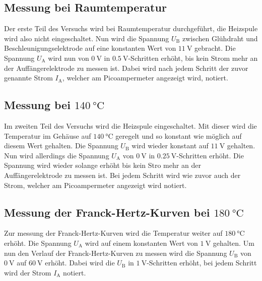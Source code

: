\subsection{Messung bei Raumtemperatur}
Der erste Teil des Versuchs wird bei Raumtemperatur durchgeführt, die Heizspule wird also nicht eingeschaltet.
Nun wird die Spannung $U_\text{B}$ zwischen Glühdraht und Beschleunigungselektrode auf eine konstanten Wert von $\SI{11}{\V}$ gebracht.
Die Spannung $U_\text{A}$ wird nun von $\SI{0}{\V}$ in $\SI{0.5}{\V}$-Schritten erhöht, bis kein Strom mehr an der Auffängerelektrode zu messen ist.
Dabei wird nach jedem Schritt der zuvor genannte Strom $I_\text{A}$, welcher am Picoampermeter angezeigt wird, notiert.

\subsection{Messung bei $\SI{140}{\celsius}$}
Im zweiten Teil des Versuchs wird die Heizspule eingeschaltet.
Mit dieser wird die Temperatur im Gehäuse auf $\SI{140}{\celsius}$ geregelt und so konstant wie möglich auf diesem Wert gehalten.
Die Spannung $U_\text{B}$ wird wieder konstant auf $\SI{11}{\V}$ gehalten.
Nun wird allerdings die Spannung $U_\text{A}$ von $\SI{0}{\V}$ in $\SI{0.25}{\V}$-Schritten erhöht.
Die Spannung wird wieder solange erhöht bis kein Stro mehr an der Auffängerelektrode zu messen ist.
Bei jedem Schritt wird wie zuvor auch der Strom, welcher am Picoampermeter angezeigt wird notiert.

\subsection{Messung der Franck-Hertz-Kurven bei $\SI{180}{\celsius}$}
Zur messung der Franck-Hertz-Kurven wird die Temperatur weiter auf $\SI{180}{\celsius}$ erhöht.
Die Spannung $U_\text{A}$ wird auf einem konstanten Wert von $\SI{1}{\V}$ gehalten.
Um nun den Verlauf der Franck-Hertz-Kurven zu messen wird die Spannung $U_\text{B}$ von $\SI{0}{\V}$ auf $\SI{60}{\V}$ erhöht.
Dabei wird die $U_\text{B}$ in $\SI{1}{\V}$-Schritten erhöht, bei jedem Schritt wird der Strom $I_\text{A}$ notiert.
